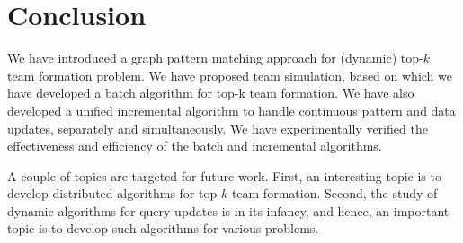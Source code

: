 \section{Conclusion}
\label{sec-conclusion}

We have introduced a graph pattern matching approach for (dynamic) top-$k$ team formation problem.
We have proposed team simulation,
based on which we have developed a batch algorithm for top-k team formation.
We have also developed a unified incremental algorithm to handle continuous pattern and data updates, separately and simultaneously.
We have experimentally verified the effectiveness and efficiency of the batch and incremental algorithms.

A couple of topics are targeted for future work.  First, an interesting topic is to develop distributed algorithms for top-$k$ team formation.
Second, the study of dynamic algorithms for query updates is in its infancy,
and hence, an important topic is to develop such algorithms for various problems.

